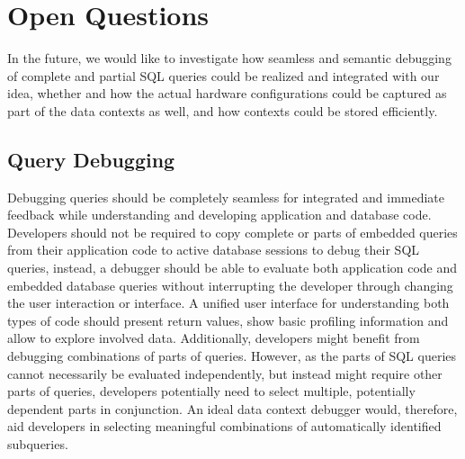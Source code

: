 \section{Open Questions} \label{sec:OPEN_QUESTIONS}
In the future, we would like to investigate how seamless and semantic debugging of complete and partial SQL queries could be realized and integrated with our idea, whether and how the actual hardware configurations could be captured as part of the data contexts as well, and how contexts could be stored efficiently.

\subsection{Query Debugging}
Debugging queries should be completely seamless for integrated and immediate feedback while understanding and developing application and database code.
Developers should not be required to copy complete or parts of embedded queries from their application code to active database sessions to debug their SQL queries, instead, a debugger should be able to evaluate both application code and embedded database queries without interrupting the developer through changing the user interaction or interface.
A unified user interface for understanding both types of code should present return values, show basic profiling information and allow to explore involved data.
Additionally, developers might benefit from debugging combinations of parts of queries.
However, as the parts of SQL queries cannot necessarily be evaluated independently, but instead might require other parts of queries, developers potentially need to select multiple, potentially dependent parts in conjunction. 
An ideal data context debugger would, therefore, aid developers in selecting meaningful combinations of automatically identified subqueries.


